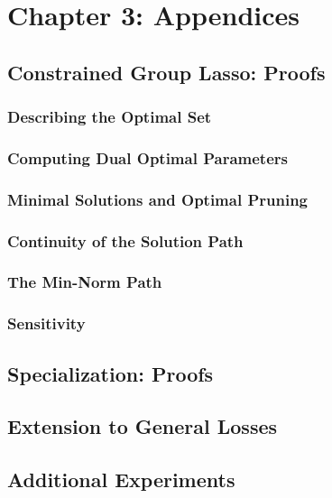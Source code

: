 
\chapter{Chapter 3: Appendices}

\section{Constrained Group Lasso: Proofs}\label{app:cgl}

\subsection{Describing the Optimal Set}



\subsection{Computing Dual Optimal Parameters}



\subsection{Minimal Solutions and Optimal Pruning}



\subsection{Continuity of the Solution Path}



\subsection{The Min-Norm Path}



\subsection{Sensitivity}



\section{Specialization: Proofs}\label{app:specializations}



\section{Extension to General Losses}\label{app:general-losses}



\section{Additional Experiments}\label{app:sol-fn-additional-experiments}


